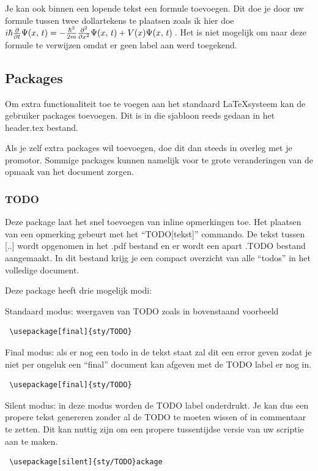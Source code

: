 Je kan ook binnen een lopende tekst een formule toevoegen. Dit doe je door uw formule tussen twee dollartekens te plaatsen zoals ik hier doe $i \hbar {\partial \over \partial t} \Psi(x,\,t)= -{\hbar^2  \over 2m} {\partial^2 \over \partial x^2} \Psi(x,\,t)+ V(x)\Psi(x,\,t)\,$. Het is niet mogelijk om naar deze formule te verwijzen omdat er geen label aan werd toegekend.


\subsection{Packages}
Om extra functionaliteit toe te voegen aan het standaard \LaTeX systeem kan de gebruiker packages toevoegen. Dit is in die sjabloon reeds gedaan in het header.tex bestand.

Als je zelf extra packages wil toevoegen, doe dit dan steeds in overleg met je promotor. Sommige packages kunnen namelijk voor te grote veranderingen van de opmaak van het document zorgen.


\subsubsection{TODO}

Deze package laat het snel toevoegen van inline opmerkingen toe.
Het plaatsen van een opmerking gebeurt met het ``TODO[tekst]'' commando.
De tekst tussen [..] wordt opgenomen in het .pdf bestand en er wordt een apart .TODO bestand aangemaakt. 
In dit bestand krijg je een compact overzicht van alle ``todos'' in het volledige document.


Deze package heeft drie mogelijk modi:

Standaard modus: weergaven van TODO zoals in bovenstaand voorbeeld
\begin{verbatim}
 \usepackage[final]{sty/TODO}
\end{verbatim}

Final modus: als er nog een todo in de tekst staat zal dit een error geven zodat je niet per ongeluk een ``final'' document kan afgeven met de TODO label er nog in.
\begin{verbatim}
 \usepackage[final]{sty/TODO}
\end{verbatim}

Silent modus: in deze modus worden de TODO label onderdrukt. 
Je kan dus een propere tekst genereren zonder al de TODO te moeten wissen of in commentaar te zetten. 
Dit kan nuttig zijn om een propere tussentijdse versie van uw scriptie aan te maken.
\begin{verbatim}
 \usepackage[silent]{sty/TODO}ackage 
\end{verbatim}







